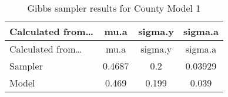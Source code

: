 \documentclass[12pt,twoside]{reedthesis}
\begin{document}
  \begin{longtable}[]{@{}lccc@{}}
  \caption{Gibbs sampler results for County Model 1
  \label{tab:gibbs_1}}\tabularnewline
  \toprule
  \begin{minipage}[b]{0.26\columnwidth}\raggedright\strut
  Calculated from\ldots{}\strut
  \end{minipage} & \begin{minipage}[b]{0.11\columnwidth}\centering\strut
  mu.a\strut
  \end{minipage} & \begin{minipage}[b]{0.12\columnwidth}\centering\strut
  sigma.y\strut
  \end{minipage} & \begin{minipage}[b]{0.12\columnwidth}\centering\strut
  sigma.a\strut
  \end{minipage}\tabularnewline
  \midrule
  \endfirsthead
  \toprule
  \begin{minipage}[b]{0.26\columnwidth}\raggedright\strut
  Calculated from\ldots{}\strut
  \end{minipage} & \begin{minipage}[b]{0.11\columnwidth}\centering\strut
  mu.a\strut
  \end{minipage} & \begin{minipage}[b]{0.12\columnwidth}\centering\strut
  sigma.y\strut
  \end{minipage} & \begin{minipage}[b]{0.12\columnwidth}\centering\strut
  sigma.a\strut
  \end{minipage}\tabularnewline
  \midrule
  \endhead
  \begin{minipage}[t]{0.26\columnwidth}\raggedright\strut
  Sampler\strut
  \end{minipage} & \begin{minipage}[t]{0.11\columnwidth}\centering\strut
  0.4687\strut
  \end{minipage} & \begin{minipage}[t]{0.12\columnwidth}\centering\strut
  0.2\strut
  \end{minipage} & \begin{minipage}[t]{0.12\columnwidth}\centering\strut
  0.03929\strut
  \end{minipage}\tabularnewline
  \begin{minipage}[t]{0.26\columnwidth}\raggedright\strut
  Model\strut
  \end{minipage} & \begin{minipage}[t]{0.11\columnwidth}\centering\strut
  0.469\strut
  \end{minipage} & \begin{minipage}[t]{0.12\columnwidth}\centering\strut
  0.199\strut
  \end{minipage} & \begin{minipage}[t]{0.12\columnwidth}\centering\strut
  0.039\strut
  \end{minipage}\tabularnewline
  \bottomrule
  \end{longtable}
  
\end{document}
